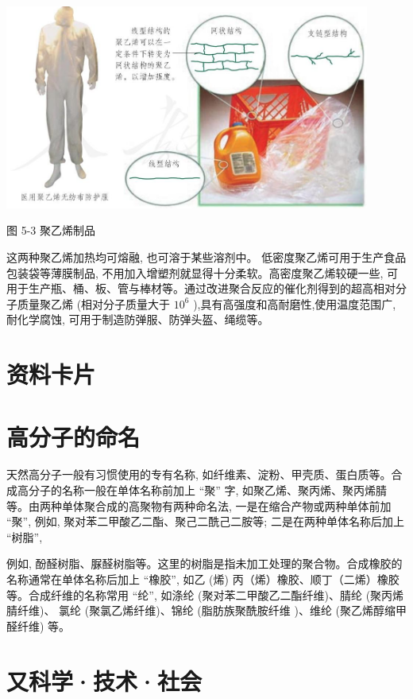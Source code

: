 \documentclass[10pt]{article}
\begin{document}
\begin{center}
\includegraphics[max width=0.9\textwidth]{images/0190efc5-b58a-7c43-bfb0-e0a030df9cfd_143_540396.jpg}
\end{center}

图 5-3 聚乙烯制品

这两种聚乙烯加热均可熔融, 也可溶于某些溶剂中。 低密度聚乙烯可用于生产食品包装袋等薄膜制品, 不用加入增塑剂就显得十分柔软。高密度聚乙烯较硬一些, 可用于生产瓶、桶、板、管与棒材等。通过改进聚合反应的催化剂得到的超高相对分子质量聚乙烯 (相对分子质量大于 \({10}^{6}\) ),具有高强度和高耐磨性,使用温度范围广,耐化学腐蚀, 可用于制造防弹服、防弹头盔、绳缆等。

\section*{资料卡片}

\section*{高分子的命名}

天然高分子一般有习惯使用的专有名称, 如纤维素、淀粉、甲壳质、蛋白质等。合成高分子的名称一般在单体名称前加上 “聚” 字, 如聚乙烯、聚丙烯、聚丙烯腈等。由两种单体聚合成的高聚物有两种命名法, 一是在缩合产物或两种单体前加 “聚”, 例如, 聚对苯二甲酸乙二酯、聚己二酰己二胺等; 二是在两种单体名称后加上 “树脂”,

例如, 酚醛树脂、脲醛树脂等。这里的树脂是指未加工处理的聚合物。合成橡胶的名称通常在单体名称后加上 “橡胶”, 如乙 (烯) 丙（烯）橡胶、顺丁（二烯）橡胶等。合成纤维的名称常用 “纶”, 如涤纶 (聚对苯二甲酸乙二酯纤维)、腈纶 (聚丙烯腈纤维)、 氯纶 (聚氯乙烯纤维)、锦纶 (脂肪族聚酰胺纤维 )、维纶 (聚乙烯醇缩甲醛纤维) 等。

\section*{又科学·技术·社会}
\end{document}
